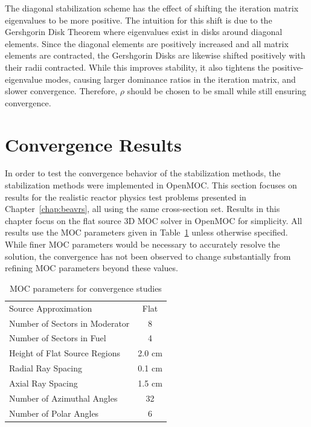The diagonal stabilization scheme has the effect of shifting the iteration matrix eigenvalues to be more positive. The intuition for this shift is due to the Gershgorin Disk Theorem where eigenvalues exist in disks around diagonal elements. Since the diagonal elements are positively increased and all matrix elements are contracted, the Gershgorin Disks are likewise shifted positively with their radii contracted. While this improves stability, it also tightens the positive-eigenvalue modes, causing larger dominance ratios in the iteration matrix, and slower convergence. Therefore, $\rho$ should be chosen to be small while still ensuring convergence. 

\section{Convergence Results}
\label{sec:convergence-results}

In order to test the convergence behavior of the stabilization methods, the stabilization methods were implemented in OpenMOC. This section focuses on results for the realistic reactor physics test problems presented in Chapter~\ref{chap:beavrs}, all using the same cross-section set. Results in this chapter focus on the flat source 3D \ac{MOC} solver in OpenMOC for simplicity. All results use the \ac{MOC} parameters given in Table~\ref{tab:convergence-tests-params} unless otherwise specified. While finer \ac{MOC} parameters would be necessary to accurately resolve the solution, the convergence has not been observed to change substantially from refining \ac{MOC} parameters beyond these values.

\begin{table}[ht]
	\centering
	\caption{MOC parameters for convergence studies}
	\medskip
	\begin{tabular}{lc}
		\hline
		Source Approximation & Flat \\
		Number of Sectors in Moderator & 8 \\
		Number of Sectors in Fuel & 4 \\
		Height of Flat Source Regions & 2.0 cm \\
		Radial Ray Spacing & 0.1 cm \\
		Axial Ray Spacing & 1.5 cm \\
		Number of Azimuthal Angles & 32 \\
		Number of Polar Angles & 6 \\
		\hline
	\end{tabular}
	\label{tab:convergence-tests-params}
\end{table}

